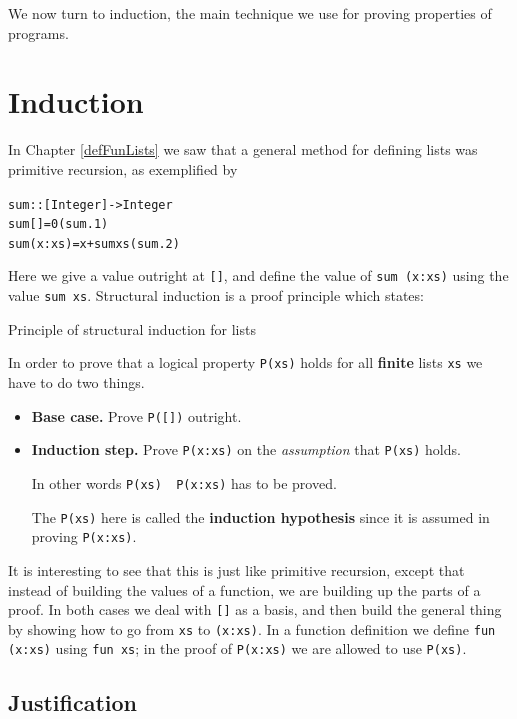 \medskip

\noindent We now turn to induction, the main technique we use for proving
properties of programs.

\section{Induction}

In Chapter \ref{defFunLists} we saw that a general method for defining lists was
primitive recursion, as exemplified by
\begin{alltt}
sum :: [Integer] -> Integer
sum []     = 0\hfill(sum.1)
sum (x:xs) = x + sum xs\hfill(sum.2)
\end{alltt}
Here we give a value outright at \texttt{[]}, and define the value of
\texttt{sum (x:xs)} using the value \texttt{sum xs}. Structural induction is a
proof principle which states:
\begin{definition}{{\sffamily Principle of structural induction for
lists}


\medskip
\noindent
In order to prove that a logical property \texttt{P(xs)} holds for all \textbf{finite} lists
\texttt{xs} we have to do two things.
\begin{itemize}
\item{\bf Base case.} Prove \texttt{P([])} outright.
\item{\bf Induction step.} Prove \texttt{P(x:xs)} on
the {\em assumption\/} that \texttt{P(xs)} holds. 

In other words 
\texttt{P(xs) \imp\ P(x:xs)} has to be proved.

The \texttt{P(xs)}
here is called the \textbf{induction hypothesis} since it is assumed in proving
\texttt{P(x:xs)}.
\end{itemize}}
\end{definition}
It is interesting to see that this is just like primitive recursion,
except that instead of building the values of a function, we are
building up the parts of a proof. 
In both cases we deal with \texttt{[]}
as a basis, and then build the general thing by showing how to go from
\texttt{xs} to \texttt{(x:xs)}. In a function definition we define
\texttt{fun (x:xs)} using \texttt{fun xs}; in the proof of \texttt{P(x:xs)}
we are allowed to use \texttt{P(xs)}.

\subsection*{Justification}

